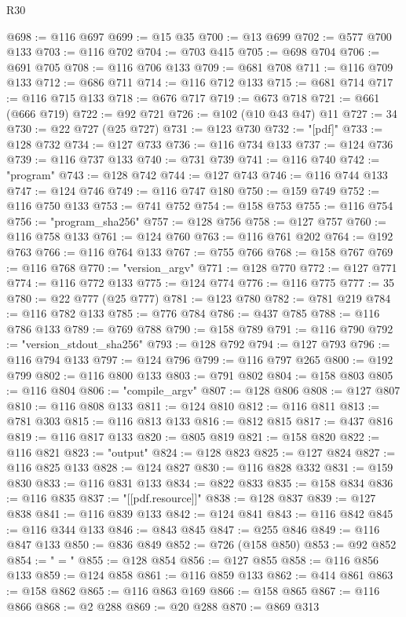 \begin{lexlean}{R30}
\begin{coremodule}
@698 := @116 @697
@699 := @15 @35
@700 := @13 @699
@702 := @577 @700 @133
@703 := @116 @702
@704 := @703 @415
@705 := @698 @704
@706 := @691 @705
@708 := @116 @706 @133
@709 := @681 @708
@711 := @116 @709 @133
@712 := @686 @711
@714 := @116 @712 @133
@715 := @681 @714
@717 := @116 @715 @133
@718 := @676 @717
@719 := @673 @718
@721 := @661 (@666 @719)
@722 := @92 @721
@726 := @102 (@10 @43 @47) @11
@727 := 34
@730 := @22 @727 (@25 @727)
@731 := @123 @730
@732 := "[pdf]"
@733 := @128 @732
@734 := @127 @733
@736 := @116 @734 @133
@737 := @124 @736
@739 := @116 @737 @133
@740 := @731 @739
@741 := @116 @740
@742 := "program"
@743 := @128 @742
@744 := @127 @743
@746 := @116 @744 @133
@747 := @124 @746
@749 := @116 @747 @180
@750 := @159 @749
@752 := @116 @750 @133
@753 := @741 @752
@754 := @158 @753
@755 := @116 @754
@756 := "program_sha256"
@757 := @128 @756
@758 := @127 @757
@760 := @116 @758 @133
@761 := @124 @760
@763 := @116 @761 @202
@764 := @192 @763
@766 := @116 @764 @133
@767 := @755 @766
@768 := @158 @767
@769 := @116 @768
@770 := "version_argv"
@771 := @128 @770
@772 := @127 @771
@774 := @116 @772 @133
@775 := @124 @774
@776 := @116 @775
@777 := 35
@780 := @22 @777 (@25 @777)
@781 := @123 @780
@782 := @781 @219
@784 := @116 @782 @133
@785 := @776 @784
@786 := @437 @785
@788 := @116 @786 @133
@789 := @769 @788
@790 := @158 @789
@791 := @116 @790
@792 := "version_stdout_sha256"
@793 := @128 @792
@794 := @127 @793
@796 := @116 @794 @133
@797 := @124 @796
@799 := @116 @797 @265
@800 := @192 @799
@802 := @116 @800 @133
@803 := @791 @802
@804 := @158 @803
@805 := @116 @804
@806 := "compile_argv"
@807 := @128 @806
@808 := @127 @807
@810 := @116 @808 @133
@811 := @124 @810
@812 := @116 @811
@813 := @781 @303
@815 := @116 @813 @133
@816 := @812 @815
@817 := @437 @816
@819 := @116 @817 @133
@820 := @805 @819
@821 := @158 @820
@822 := @116 @821
@823 := "output"
@824 := @128 @823
@825 := @127 @824
@827 := @116 @825 @133
@828 := @124 @827
@830 := @116 @828 @332
@831 := @159 @830
@833 := @116 @831 @133
@834 := @822 @833
@835 := @158 @834
@836 := @116 @835
@837 := "[[pdf.resource]]"
@838 := @128 @837
@839 := @127 @838
@841 := @116 @839 @133
@842 := @124 @841
@843 := @116 @842
@845 := @116 @344 @133
@846 := @843 @845
@847 := @255 @846
@849 := @116 @847 @133
@850 := @836 @849
@852 := @726 (@158 @850)
@853 := @92 @852
@854 := " = "
@855 := @128 @854
@856 := @127 @855
@858 := @116 @856 @133
@859 := @124 @858
@861 := @116 @859 @133
@862 := @414 @861
@863 := @158 @862
@865 := @116 @863 @169
@866 := @158 @865
@867 := @116 @866
@868 := @2 @288
@869 := @20 @288
@870 := @869 @313

\end{coremodule}
\end{lexlean}
